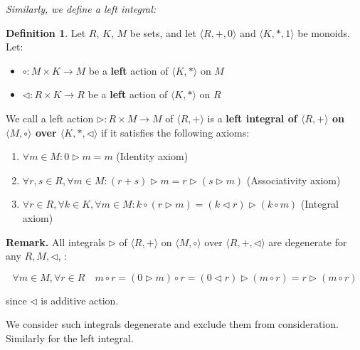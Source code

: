 \documentclass[12pt]{article}
\theoremstyle{definition}
\newtheorem{definition}{Definition}[section]
\begin{document}
\vspace{10pt}
\noindent\textit{Similarly, we define a left integral:}


\begin{definition}

Let $R$, $K$, $M$ be sets, and let $\langle R, +, 0 \rangle$ and $\langle K, *, 1 \rangle$ be monoids. Let:

\begin{itemize}
\item $\circ: M \times K \to M$ be a \textbf{left} action of $\langle K, * \rangle$ on $M$
\item $\lhd: R \times K \to R$ be a \textbf{left} action of $\langle K, * \rangle$ on $R$
\end{itemize}

We call a left action $\triangleright: R \times M \to M$ of $\langle R, + \rangle$ is a \textbf{left integral of $\langle R, + \rangle$ on $\langle M, \circ \rangle$ over $\langle K, *, \lhd \rangle$} if it satisfies the following axioms:

\begin{enumerate}
\item $\forall m \in M: 0 \triangleright m = m$ \hfill (Identity axiom)
\item $\forall r, s \in R, \forall m \in M: (r + s) \triangleright m = r \triangleright (s \triangleright m)$ \hfill (Associativity axiom)
\item $\forall r \in R, \forall k \in K, \forall m \in M: k \circ (r \triangleright m) = (k \lhd r) \triangleright (k \circ m)$ \hfill (Integral axiom)
\end{enumerate}
\end{definition}


\noindent\textbf{Remark.} All integrals $\triangleright$ of $\langle R, + \rangle$ on $\langle M, \circ \rangle$ over $\langle R, +, \lhd \rangle$ are degenerate for any $R, M,\lhd$, :

\[
\forall m \in M, \forall r \in R \quad m \circ r = (0 \triangleright m) \circ r = (0 \lhd r) \triangleright (m \circ r) = r \triangleright (m \circ r)
\]


since $\lhd$ is additive action. 

\vspace{10pt}

We consider such integrals degenerate and exclude them from consideration. Similarly for the left integral.  
\end{document}
